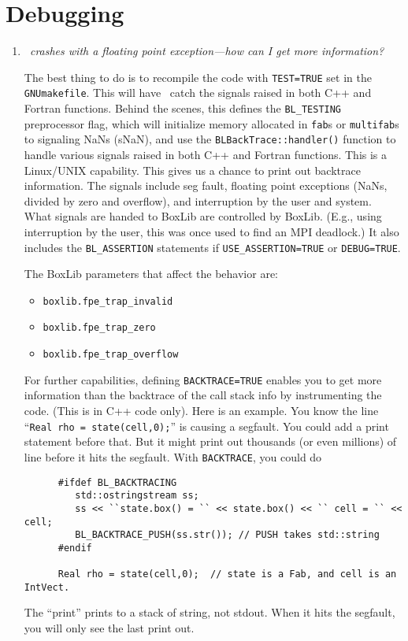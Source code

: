 \section{Debugging}

\begin{enumerate}

\item {\em \castro\ crashes with a floating point exception---how can
  I get more information?}

  The best thing to do is to recompile the code with {\tt TEST=TRUE}
  set in the {\tt GNUmakefile}.  This will have \boxlib\ catch the
  signals raised in both C++ and Fortran functions.  Behind the
  scenes, this defines the {\tt BL\_TESTING} preprocessor flag, which
  will initialize memory allocated in {\tt fab}s or {\tt multifab}s to
  signaling NaNs (sNaN), and use the {\tt BLBackTrace::handler()}
  function to handle various signals raised in both C++ and Fortran
  functions.  This is a Linux/UNIX capability.  This gives us a chance
  to print out backtrace information.  The signals include seg fault,
  floating point exceptions (NaNs, divided by zero and overflow), and
  interruption by the user and system.  What signals are handed to
  BoxLib are controlled by BoxLib.  (E.g., using interruption by the
  user, this was once used to find an MPI deadlock.)  It also includes
  the {\tt BL\_ASSERTION} statements if {\tt USE\_ASSERTION=TRUE} or
  {\tt DEBUG=TRUE}. 

  The BoxLib parameters that affect the behavior are:
  \begin{itemize}
    \item {\tt boxlib.fpe\_trap\_invalid}
    \item {\tt boxlib.fpe\_trap\_zero}
    \item {\tt boxlib.fpe\_trap\_overflow}
  \end{itemize}

  For further capabilities, defining {\tt BACKTRACE=TRUE} enables you
  to get more information than the backtrace of the call stack info by
  instrumenting the code.  (This is in C++ code only). Here is an
  example.  You know the line ``{\tt Real rho = state(cell,0);}'' is
  causing a segfault.  You could add a print statement before that.
  But it might print out thousands (or even millions) of line before
  it hits the segfault.  With {\tt BACKTRACE}, you could do

\begin{verbatim}
      #ifdef BL_BACKTRACING
         std::ostringstream ss;
         ss << ``state.box() = `` << state.box() << `` cell = `` << cell;
         BL_BACKTRACE_PUSH(ss.str()); // PUSH takes std::string
      #endif

      Real rho = state(cell,0);  // state is a Fab, and cell is an IntVect.
    \end{verbatim}

    The ``print'' prints to a stack of string, not stdout.  When it
    hits the segfault, you will only see the last print out.



\end{enumerate}


